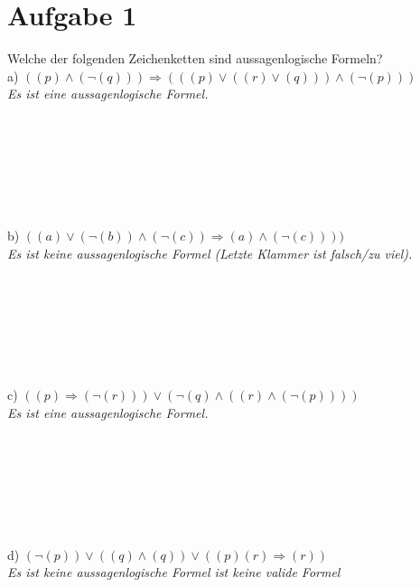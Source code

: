 \section*{Aufgabe 1}

Welche der folgenden Zeichenketten sind aussagenlogische Formeln?\\

a) $((p) \land (\lnot(q))) \Rightarrow (((p) \lor ((r) \lor (q))) \land (\lnot (p)))$\\

\textit{Es ist eine aussagenlogische Formel.}\\~\\~\\~\\~\\~\\~\\~\\

b) $((a) \lor (\lnot (b)) \land (\lnot (c)) \Rightarrow (a) \land (\lnot(c))))$\\

\textit{Es ist keine aussagenlogische Formel (Letzte Klammer ist falsch/zu viel).}\\~\\~\\~\\~\\~\\~\\~\\

c) $((p) \Rightarrow (\lnot (r))) \lor (\lnot (q) \land ((r) \land (\lnot (p))))$\\

\textit{Es ist eine aussagenlogische Formel.}\\~\\~\\~\\~\\~\\~\\~\\

d) $(\lnot (p)) \lor ((q) \land (q)) \lor ((p)(r) \Rightarrow (r))$\\

\textit{Es ist keine aussagenlogische Formel ist keine valide Formel}\\~\\~\\~\\~\\~\\~\\~\\

